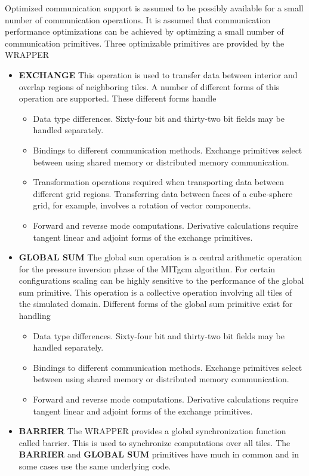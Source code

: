 Optimized communication support is assumed to be possibly available 
for a small number of communication operations.
It is assumed that communication performance optimizations can
be achieved by optimizing a small number of communication primitives.
Three optimizable primitives are provided by the WRAPPER 
\begin{itemize}
\item{\bf EXCHANGE} This operation is used to transfer data between interior
and overlap regions of neighboring tiles. A number of different forms of this
operation are supported. These different forms handle
\begin{itemize}
\item Data type differences. Sixty-four bit and thirty-two bit fields may be handled 
separately.
\item Bindings to different communication methods.
Exchange primitives select between using shared memory or distributed
memory communication.
\item Transformation operations required when transporting
data between different grid regions. Transferring data
between faces of a cube-sphere grid, for example, involves a rotation
of vector components.
\item Forward and reverse mode computations. Derivative calculations require 
tangent linear and adjoint forms of the exchange primitives.

\end{itemize}

\item{\bf GLOBAL SUM} The global sum operation is a central arithmetic
operation for the pressure inversion phase of the MITgcm algorithm.
For certain configurations scaling can be highly sensitive to
the performance of the global sum primitive. This operation is a collective
operation involving all tiles of the simulated domain. Different forms
of the global sum primitive exist for handling
\begin{itemize}
\item Data type differences. Sixty-four bit and thirty-two bit fields may be handled
separately.
\item Bindings to different communication methods.
Exchange primitives select between using shared memory or distributed
memory communication.
\item Forward and reverse mode computations. Derivative calculations require
tangent linear and adjoint forms of the exchange primitives.
\end{itemize}

\item{\bf BARRIER} The WRAPPER provides a global synchronization function
called barrier. This is used to synchronize computations over all tiles.
The {\bf BARRIER} and {\bf GLOBAL SUM} primitives have much in common and in
some cases use the same underlying code.
\end{itemize}


